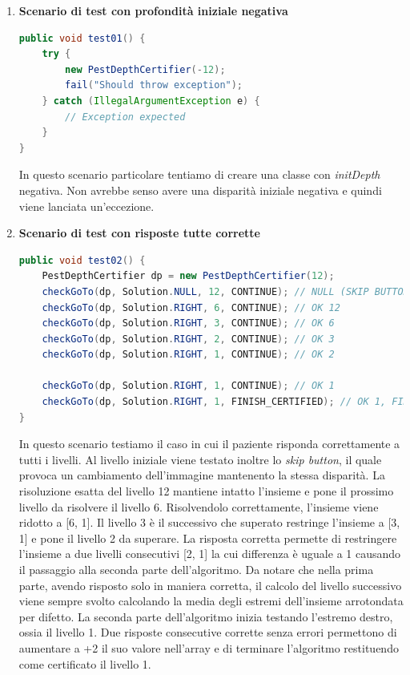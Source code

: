 \documentclass[
	corpo=12pt,
	twoside,
 	evenboxes,
	tipotesi=triennale,
    	stile=classica,
   	 greek,
]{toptesi}
\begin{document}
\begin{enumerate}

\item \textbf{Scenario di test con profondità iniziale negativa}

\begin{lstlisting}[language=Java, label=lst:test01, caption={Test 01}]
public void test01() {
	try {
		new PestDepthCertifier(-12);
		fail("Should throw exception");
	} catch (IllegalArgumentException e) {
		// Exception expected
	}
}
\end{lstlisting}

In questo scenario particolare tentiamo di creare una classe con \textit{initDepth} negativa. Non avrebbe senso avere una disparità iniziale negativa e quindi viene lanciata un'eccezione.

\item \textbf{Scenario di test con risposte tutte corrette}

\begin{lstlisting}[language=Java, label=lst:test02, caption={Test 02}]
public void test02() {
	PestDepthCertifier dp = new PestDepthCertifier(12);
	checkGoTo(dp, Solution.NULL, 12, CONTINUE); // NULL (SKIP BUTTON)
	checkGoTo(dp, Solution.RIGHT, 6, CONTINUE); // OK 12
	checkGoTo(dp, Solution.RIGHT, 3, CONTINUE); // OK 6
	checkGoTo(dp, Solution.RIGHT, 2, CONTINUE); // OK 3
	checkGoTo(dp, Solution.RIGHT, 1, CONTINUE); // OK 2

	checkGoTo(dp, Solution.RIGHT, 1, CONTINUE); // OK 1
	checkGoTo(dp, Solution.RIGHT, 1, FINISH_CERTIFIED); // OK 1, FINISH_CERTIFIED
}
\end{lstlisting}

In questo scenario testiamo il caso in cui il paziente risponda correttamente a tutti i livelli. Al livello iniziale viene testato inoltre lo \textit{skip button}, il quale provoca un cambiamento dell'immagine mantenento la stessa disparità. La risoluzione esatta del livello 12 mantiene intatto l'insieme e pone il prossimo livello da risolvere il livello 6. Risolvendolo correttamente, l'insieme viene ridotto a [6, 1]. Il livello 3 è il successivo che superato restringe l'insieme a [3, 1] e pone il livello 2 da superare. La risposta corretta permette di restringere l'insieme a due livelli consecutivi [2, 1] la cui differenza è uguale a 1 causando il passaggio alla seconda parte dell'algoritmo. Da notare che nella prima parte, avendo risposto solo in maniera corretta, il calcolo del livello successivo viene sempre svolto calcolando la media degli estremi dell'insieme arrotondata per difetto. La seconda parte dell'algoritmo inizia testando l'estremo destro, ossia il livello 1. Due risposte consecutive corrette senza errori permettono di aumentare a +2 il suo valore nell'array e di terminare l’algoritmo restituendo come certificato il livello 1.


\end{enumerate}
\end{document}
